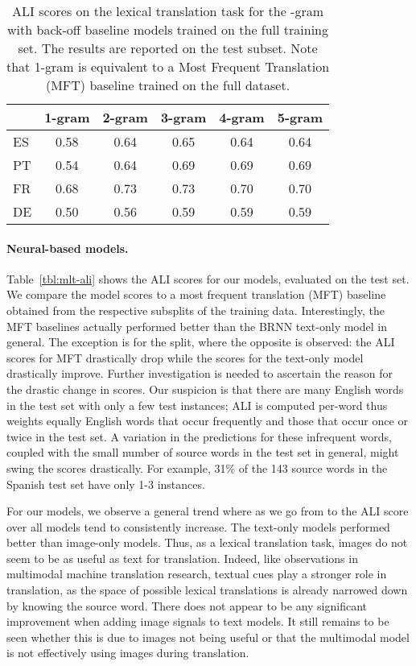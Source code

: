 \documentclass[twocolumn]{svjour3}          \smartqed  \usepackage{graphicx}
\begin{document}
\begin{table}[t]
    \caption{ALI scores on the lexical translation task for the -gram with back-off baseline models trained on the full training set. The results are reported on the test subset. Note that 1-gram is equivalent to a Most Frequent Translation (MFT) baseline trained on the full dataset.
    }
    \label{tbl:mlt-baseline}
    \centering
    \begin{tabular}{l c c c c c}
        \toprule
        & 1-gram & 2-gram & 3-gram & 4-gram & 5-gram\\
        \midrule
        ES & 0.58 & 0.64 & 0.65 & 0.64 & 0.64\\
        PT & 0.54 & 0.64 & 0.69 & 0.69 & 0.69\\
        FR & 0.68 & 0.73 & 0.73 & 0.70 & 0.70\\
        DE & 0.50 & 0.56 & 0.59 & 0.59 & 0.59\\ 
        \bottomrule
    \end{tabular}
\end{table}

\paragraph{Neural-based models. } Table~\ref{tbl:mlt-ali} shows the ALI scores for our models, evaluated on the test set. We compare the model scores to a most frequent translation (MFT) baseline obtained from the respective  subsplits of the training data.
Interestingly, the MFT baselines actually performed better than the BRNN text-only model in general. The exception is for the  split, where the opposite is observed: the ALI scores for MFT drastically drop while the scores for the text-only model drastically improve. Further investigation is needed to ascertain the reason for the drastic change in scores. Our suspicion is that there are many English words in the test set with only a few test instances; ALI is computed per-word thus weights equally English words that occur frequently and those that occur once or twice in the test set. A variation in the predictions for these infrequent words, coupled with the small number of source words in the test set in general, might swing the scores drastically. For example, 31\% of the 143 source words in the Spanish test set have only 1-3 instances. 

For our models, we observe a general trend where as we go from  to  the ALI score over all models tend to consistently increase. The text-only models performed better than image-only models. Thus, as a lexical translation task, images do not seem to be as useful as text for translation. Indeed, like observations in multimodal machine translation research, textual cues play a stronger role in translation, as the space of possible lexical translations is already narrowed down by knowing the source word. There does not appear to be any significant improvement when adding image signals to text models. It still remains to be seen whether this is due to images not being useful or that the multimodal model is not effectively using images during translation.
\end{document}
